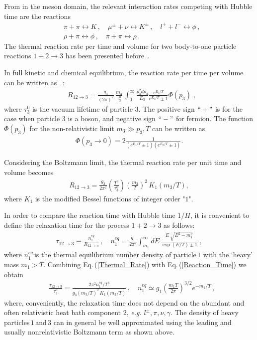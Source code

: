 From  in the meson domain, the relevant interaction rates competing with Hubble time are the reactions
\begin{align}
 &\pi+\pi\leftrightarrow K\,,\quad\mu^\pm+\nu\leftrightarrow K^\pm\,,\quad l^++l^-\leftrightarrow\phi\,,\\
 &\rho+\pi\leftrightarrow\phi\,,\quad \pi+\pi\leftrightarrow\rho\,.
\end{align}
The thermal reaction rate per time and volume for two body-to-one particle reactions $1+2\rightarrow 3$ has been presented before~\cite{Koch:1986ud,Kuznetsova:2008jt,Kuznetsova:2010pi}. 

In full kinetic and chemical equilibrium, the reaction rate per time per volume can be written as~\cite{Kuznetsova:2010pi} :
\begin{align}
&R_{12\to 3}=\frac{g_3}{(2\pi)^2}\,\frac{m_3}{\tau^0_3}\,\int^\infty_0\frac{p^2_3dp_3}{E_3}\frac{e^{E_3/T}}{e^{E_3/T}\pm1}\Phi(p_3)\;,
\end{align}
where $\tau^0_3$ is the vacuum lifetime of particle $3$. The positive sign $``+"$ is for the case when particle $3$ is a boson, and negative sign $``-"$ for fermion. The function $\Phi(p_3)$ for the non-relativistic limit $m_3\gg p_3,T$ can be written as 
\begin{align}
\Phi(p_3\to0)=2\frac{1}{(e^{E_1/T}\pm1)(e^{E_2/T}\pm1)}.
\end{align}

Considering the Boltzmann limit, the thermal reaction rate per unit time and volume becomes
\begin{align}
\label{Thermal_Rate}
R_{12\rightarrow3}=\frac{g_3}{2\pi^2}\left(\frac{T^3}{\tau^0_3}\right)\left(\frac{m_3}{T}\right)^2\,K_1(m_3/T),
\end{align}
where $K_1$ is the modified Bessel functions of integer order "$1$". 

In order to compare the reaction time with Hubble time $1/H$, it is convenient to define the relaxation time for the process $1+2\rightarrow 3$ as follows:
\begin{align}
\label{Reaction_Time}
\tau_{12\rightarrow 3}\equiv\frac{n^{eq}_{1}}{R_{12\rightarrow n}}\,,\quad
n^{eq}_1=\frac{g_1}{2\pi^2}\int_{m_1}^\infty\!\!\!\!dE\,\frac{E\,\sqrt{E^2-m_1^2}}{\exp{\left(E/T\right)}\pm1}\;, 
\end{align}
where $n^{eq}_1$\,is the thermal equilibrium number density of particle\,$1$ with the `heavy' mass $m_1>T$.  Combining Eq.\,(\ref{Thermal_Rate}) with  Eq.\,(\ref{Reaction_Time}) we obtain
\begin{align}\label{RelaxationTime}
&\frac{\tau_{12\rightarrow3}}{ \tau^0_3}=  
\frac{2\pi^2 n^{eq}_1/T^3}{g_3(m_3/T)^2\,K_1(m_3/T)}\,, \quad 
n^{eq}_1\simeq g_1\left(\frac{m_1 T}{2\pi}\right)^{3/2}e^{-m_1/T}\,,
\end{align}
where, conveniently, the relaxation time does not depend on the abundant and often relativistic heat bath component $2$, {\it e.g.\/} $l^\pm,\pi,\nu,\gamma$. The density of heavy particles\,$1$\,and\,$3$ can in general be well approximated using the leading and usually nonrelativistic Boltzmann term as shown above.

